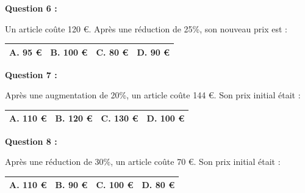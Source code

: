 \documentclass[12pt,a4paper]{article}
\begin{document}
\vspace{0.7cm}

\textbf{Question 6 :}
\vspace{5pt}

Un article coûte 120 €. Après une réduction de 25\%, son nouveau prix est :
\vspace{0.3cm}

\renewcommand{\arraystretch}{3}
\begin{tabular}{|m{3.4cm}|m{3.4cm}|m{3.4cm}|m{3.4cm}|}
\hline
\centering \vspace{-0.3cm} \textbf{A.} 95 € & 
\centering \vspace{-0.3cm} \textbf{B.} 100 € & 
\centering \vspace{-0.3cm} \textbf{C.} 80 € & 
\centering \vspace{-0.3cm} \textbf{D.} 90 € \tabularnewline
\hline
\end{tabular}

\vspace{0.7cm}

\textbf{Question 7 :}
\vspace{5pt}

Après une augmentation de 20\%, un article coûte 144 €. Son prix initial était :
\vspace{0.3cm}

\renewcommand{\arraystretch}{3}
\begin{tabular}{|m{3.4cm}|m{3.4cm}|m{3.4cm}|m{3.4cm}|}
\hline
\centering \vspace{-0.3cm} \textbf{A.} 110 € & 
\centering \vspace{-0.3cm} \textbf{B.} 120 € & 
\centering \vspace{-0.3cm} \textbf{C.} 130 € & 
\centering \vspace{-0.3cm} \textbf{D.} 100 € \tabularnewline
\hline
\end{tabular}

\vspace{0.7cm}

\textbf{Question 8 :}
\vspace{5pt}

Après une réduction de 30\%, un article coûte 70 €. Son prix initial était :
\vspace{0.3cm}

\renewcommand{\arraystretch}{3}
\begin{tabular}{|m{3.4cm}|m{3.4cm}|m{3.4cm}|m{3.4cm}|}
\hline
\centering \vspace{-0.3cm} \textbf{A.} 110 € & 
\centering \vspace{-0.3cm} \textbf{B.} 90 € & 
\centering \vspace{-0.3cm} \textbf{C.} 100 € & 
\centering \vspace{-0.3cm} \textbf{D.} 80 € \tabularnewline
\hline
\end{tabular}
\end{document}
